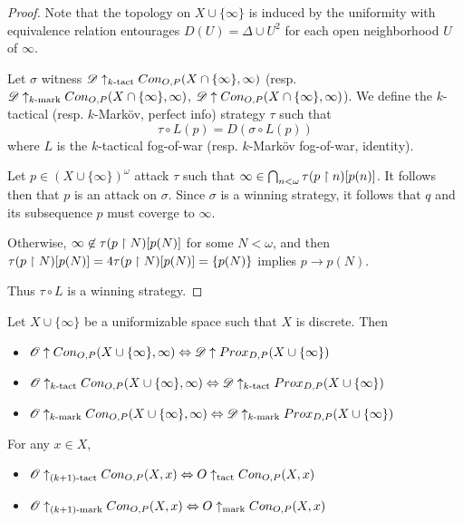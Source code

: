 \begin{proof}
  Note that the topology on $X\cup\{\infty\}$ is induced by the uniformity with equivalence relation entourages $D(U)=\Delta\cup U^2$ for each open neighborhood $U$ of $\infty$.

  Let $\sigma$ witness $\mathscr{D} \uparrow_{k\text{-tact}}Con_{O,P}(X\cap\{\infty\},\infty)$ (resp. $\mathscr{D} \uparrow_{k\text{-mark}}Con_{O,P}(X\cap\{\infty\},\infty)$, $\mathscr{D}\uparrow Con_{O,P}(X\cap\{\infty\},\infty)$). We define the $k$-tactical (resp. $k$-Mark\"ov, perfect info) strategy $\tau$ such that
    \[
      \tau\circ L(p)
        =
      D(\sigma\circ L(p))
    \]
  where $L$ is the $k$-tactical fog-of-war (resp. $k$-Mark\"ov fog-of-war, identity).

  Let $p\in (X\cup\{\infty\})^\omega$ attack $\tau$ such that $\infty\in\bigcap_{n<\omega}\tau(p\restriction n)[p(n)]$. It follows then that $p$ is an attack on $\sigma$. Since $\sigma$ is a winning strategy, it follows that $q$ and its subsequence $p$ must coverge to $\infty$.

  Otherwise, $\infty\not\in\tau(p\restriction N)[p(N)]$ for some $N<\omega$, and then $\tau(p\restriction N)[p(N)]=4\tau(p\restriction N)[p(N)]=\{p(N)\}$ implies $p\to p(N)$.

  Thus $\tau\circ L$ is a winning strategy.
\end{proof}

\begin{corollary}
  Let $X\cup\{\infty\}$ be a uniformizable space such that $X$ is discrete. Then
  \begin{itemize}
    \item
      $\mathscr{O}\uparrow Con_{O,P}(X\cup\{\infty\},\infty) \Leftrightarrow \mathscr{D} \uparrow Prox_{D,P}(X\cup\{\infty\})$
    \item
      $\mathscr{O}\uparrow_{k\text{-tact}} Con_{O,P}(X\cup\{\infty\},\infty) \Leftrightarrow \mathscr{D} \uparrow_{k\text{-tact}} Prox_{D,P}(X\cup\{\infty\})$
    \item
      $\mathscr{O}\uparrow_{k\text{-mark}} Con_{O,P}(X\cup\{\infty\},\infty) \Leftrightarrow \mathscr{D} \uparrow_{k\text{-mark}} Prox_{D,P}(X\cup\{\infty\})$
  \end{itemize}
\end{corollary}

\begin{proposition} For any $x\in X$,
  \begin{itemize}
    \item
      $\mathscr{O}\uparrow_{(k+1)\text{-tact}}Con_{O,P}(X,x) \Leftrightarrow O\uparrow_{\text{tact}}Con_{O,P}(X,x)$
    \item
      $\mathscr{O}\uparrow_{(k+1)\text{-mark}}Con_{O,P}(X,x) \Leftrightarrow O\uparrow_{\text{mark}}Con_{O,P}(X,x)$
  \end{itemize}
\end{proposition}

